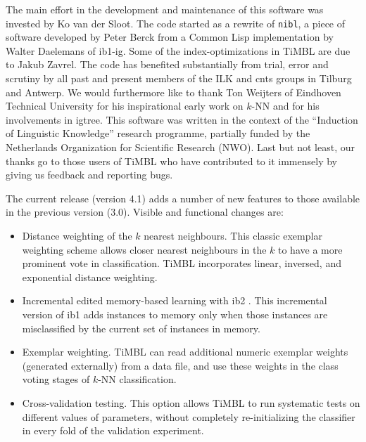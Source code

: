 \documentclass{report}
\begin{document}
The main effort in the development and maintenance of this software
was invested by Ko van der Sloot. The code started as a rewrite of
{\tt nibl}, a piece of software developed by Peter Berck from a Common
Lisp implementation by Walter Daelemans of {\sc ib1-ig}. Some of the
index-optimizations in TiMBL are due to Jakub Zavrel. The code has
benefited substantially from trial, error and scrutiny by all past and
present members of the ILK and {\sc cnts} groups in Tilburg and
Antwerp. We would furthermore like to thank Ton Weijters of Eindhoven
Technical University for his inspirational early work on $k$-NN and
for his involvements in {\sc igtree}. This software was written in
the context of the ``Induction of Linguistic Knowledge'' research
programme, partially funded by the Netherlands Organization for
Scientific Research (NWO). Last but not least, our thanks go to those
users of TiMBL who have contributed to it immensely by giving us
feedback and reporting bugs.

The current release (version 4.1) adds a number of new features to
those available in the previous version (3.0). Visible and functional
changes are:

\begin{itemize}

\item Distance weighting of the $k$ nearest neighbours. This classic
exemplar weighting scheme \cite{Dudani76} allows closer nearest
neighbours in the $k$ to have a more prominent vote in
classification. TiMBL incorporates linear, inversed, and exponential
distance weighting.

\item Incremental edited memory-based learning with {\sc ib2}
\cite{Aha+91}. This incremental version of {\sc ib1} adds instances to
memory only when those instances are misclassified by the current set
of instances in memory.

\item Exemplar weighting. TiMBL can read additional numeric exemplar
weights (generated externally) from a data file, and use these
weights in the class voting stages of $k$-NN classification.

\item Cross-validation testing. This option allows TiMBL to run
systematic tests on different values of parameters, without completely
re-initializing the classifier in every fold of the validation experiment.

\end{itemize}
\end{document}
